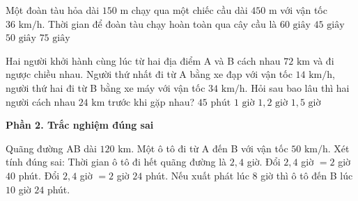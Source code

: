 \begin{ex} %
Một đoàn tàu hỏa dài $150\text{ m}$ chạy qua một chiếc cầu dài $450\text{ m}$ với vận tốc $36\text{ km/h}$. Thời gian để đoàn tàu chạy hoàn toàn qua cây cầu là
\choice
{\True $60\text{ giây}$}
{$45\text{ giây}$}
{$50\text{ giây}$}
{$75\text{ giây}$}
\end{ex}

\begin{ex} %
Hai người khởi hành cùng lúc từ hai địa điểm A và B cách nhau $72\text{ km}$ và đi ngược chiều nhau. Người thứ nhất đi từ A bằng xe đạp với vận tốc $14\text{ km/h}$, người thứ hai đi từ B bằng xe máy với vận tốc $34\text{ km/h}$. Hỏi sau bao lâu thì hai người cách nhau $24\text{ km}$ trước khi gặp nhau?
\choice
{$45\text{ phút}$}
{\True $1\text{ giờ}$}
{$1{,}2\text{ giờ}$}
{$1{,}5\text{ giờ}$}
\end{ex}

\textbf{Phần 2. Trắc nghiệm đúng sai}

\begin{ex} %
Quãng đường AB dài $120\text{ km}$. Một ô tô đi từ A đến B với vận tốc $50\text{ km/h}$. Xét tính đúng sai:
\choiceTF
{\True Thời gian ô tô đi hết quãng đường là $2{,}4$ giờ.}
{Đổi $2{,}4$ giờ $= 2$ giờ $40$ phút.}
{\True Đổi $2{,}4$ giờ $= 2$ giờ $24$ phút.}
{\True Nếu xuất phát lúc $8$ giờ thì ô tô đến B lúc $10$ giờ $24$ phút.}
\end{ex}

